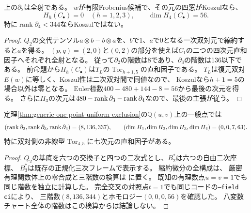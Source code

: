 \begin{proposition}[小複体による必要条件]\label{prop:one-return-small-obstruction}
上の$\partial_2$は全射である。
$w$が有限Frobenius候補で、その元の四窓がKoszulなら、
\[
 H_h(C_\bullet)=0\quad(h=1,2,3),\qquad \dim H_4(C_\bullet)=56.
\]
特に$\operatorname{rank}\partial_4<344$ならKoszulではない。
\end{proposition}
\begin{proof}
$Q_2$の交代テンソル$a\otimes b-b\otimes a$を、$b$で1、$a$で0となる一次双対元で縮約すると$a$を得る。
$(p,q)=(2,0)$と$(0,2)$の部分を使えば$C_1$の二つの四次元直和因子へそれぞれ全射となる。
従って$\partial_2$の階数は8であり、$\partial_3$の階数は136以下である。
前命題から$H_h(C_\bullet)$は$T_L$の$\operatorname{Tor}_{h+1,5}$の直和因子である。
$T_L$は復元双対$E(w)$に等しく、Koszul性は二次双対間で同値なので、
Koszulなら$h+1=5$の場合以外は零となる。
Euler標数$400-480+144-8=56$から最後の次元を得る。
さらに$H_3$の次元は$480-\operatorname{rank}\partial_3-\operatorname{rank}\partial_4$なので、最後の主張が従う。
\end{proof}

\begin{proposition}[既知の二変数境界における一回Tor]\label{prop:one-return-two-variable}
定理\ref{thm:generic-one-point-uniform-exclusion}の$\mathbb Q(u,v)$上の一般点では
\[
 (\operatorname{rank}\partial_2,\operatorname{rank}\partial_3,\operatorname{rank}\partial_4)=(8,136,337),\qquad
 (\dim H_1,\dim H_2,\dim H_3,\dim H_4)=(0,0,7,63).
\]
特に双対側の非線型$\operatorname{Tor}_{4,5}$に七次元の直和因子がある。
\end{proposition}
\begin{proof}
$Q_2$の基底を六つの交換子と四つの二次式とし、$B_2^*$は六つの自由二次座標、
$B_3^*$は既存の正規化三次フレームで表示する。
縮約微分の全構成は、
厳密有理関数体上の零合成と三階数の検算は
に置く。
既知の有理数点$u=v=1$でも同じ階数を独立に計算した。
完全交叉の対照点$t=1$でも同じコードの\texttt{--field ci}により、
三階数$(8,136,344)$とホモロジー$(0,0,0,56)$を確認した。
八変数チャート全体の階数はこの検算からは結論しない。
\end{proof}


